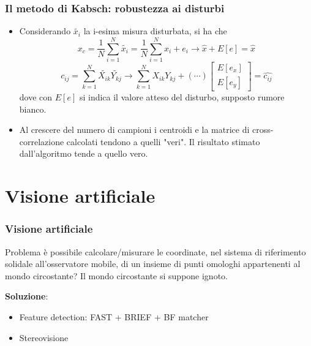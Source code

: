 \documentclass{beamer}
\begin{document}
\begin{frame}
\frametitle{Il metodo di Kabsch: robustezza ai disturbi}
\begin{itemize}
	\item Considerando $\tilde{x_i}$ la i-esima misura disturbata, si ha che
	\begin{equation}
	x_c = \frac{1}{N}\sum_{i = 1}^{N} \tilde{x_i} = \frac{1}{N}\sum_{i = 1}^{N} x_i + e_i \longrightarrow \hat{x} + E[e] = \hat{x}
	\end{equation}
	\begin{equation}
	c_{ij} = \sum_{k = 1}^{N}  \tilde{X_{ik}} \tilde{Y_{kj}} \longrightarrow \sum_{k = 1}^{N} X_{ik} Y_{kj} + (\cdots) \begin{bmatrix}
	E[e_x] \\
	E[e_y]
	\end{bmatrix} = \hat{c_{ij}}
	\end{equation}
	dove con $E[e]$ si indica il valore atteso del disturbo, supposto rumore bianco.
	\item Al crescere del numero di campioni i centroidi e la matrice di cross-correlazione calcolati tendono a quelli "veri". Il risultato stimato dall'algoritmo tende a quello vero.
\end{itemize}
\end{frame}

\section{Visione artificiale}

\begin{frame}
\frametitle{Visione artificiale}
\begin{block}{Problema}
	è possibile calcolare/misurare le coordinate, nel sistema di riferimento solidale all'osservatore mobile, di un insieme di punti omologhi appartenenti al mondo circostante? 
	Il mondo circostante si suppone ignoto.  
\end{block}

\textbf{Soluzione}: 
\begin{itemize}
	\item Feature detection:  FAST + BRIEF + BF matcher
	\item Stereovisione
\end{itemize}
\end{frame}
\end{document}
